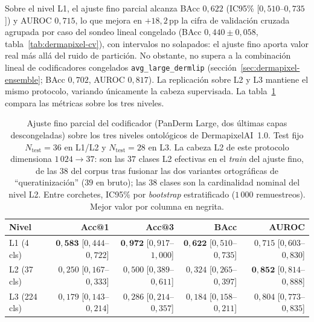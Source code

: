 Sobre el nivel L1, el ajuste fino parcial alcanza BAcc $0{,}622$
(IC95\% [$0{,}510$--$0{,}735$]) y AUROC $0{,}715$, lo que mejora en
$+18{,}2$\,pp la cifra de validación cruzada agrupada por caso del
sondeo lineal congelado (BAcc $0{,}440 \pm 0{,}058$,
tabla~\ref{tab:dermapixel-cv}), con intervalos no solapados: el
ajuste fino aporta valor real más allá del ruido de partición. No
obstante, no supera a la combinación lineal de codificadores
congelados \texttt{avg\_large\_dermlip}
(sección~\ref{sec:dermapixel-ensemble}; BAcc $0{,}702$, AUROC
$0{,}817$). La replicación sobre L2 y L3 mantiene el mismo
protocolo, variando únicamente la cabeza supervisada. La
tabla~\ref{tab:dermapixel-ft-multilevel} compara las métricas
sobre los tres niveles.

\begin{table}[H]
\centering
\footnotesize
\setlength{\tabcolsep}{4pt}
\renewcommand{\arraystretch}{0.95}
\caption{Ajuste fino parcial del codificador (PanDerm Large, dos
últimas capas descongeladas) sobre los tres niveles ontológicos de
DermapixelAI~1.0. Test fijo $N_{\mathrm{test}} = 36$ en L1/L2 y
$N_{\mathrm{test}} = 28$ en L3. La cabeza L2 de este protocolo
dimensiona $1\,024 \to 37$: son las $37$ clases L2 efectivas en el
\emph{train} del ajuste fino, de las $38$ del corpus tras fusionar
las dos variantes ortográficas de ``queratinización'' ($39$ en
bruto); las $38$ clases son la cardinalidad nominal del nivel L2.
Entre corchetes, IC95\% por \emph{bootstrap}
estratificado ($1\,000$ remuestreos). Mejor valor por columna en
negrita.}
\label{tab:dermapixel-ft-multilevel}
\begin{tabular}{lrrrr}
\hline
Nivel        & Acc@1                            & Acc@3                            & BAcc                             & AUROC \\
\hline
L1 (4 cls)   & $\mathbf{0{,}583}$ [$0{,}444$--$0{,}722$] & $\mathbf{0{,}972}$ [$0{,}917$--$1{,}000$] & $\mathbf{0{,}622}$ [$0{,}510$--$0{,}735$] & $0{,}715$ [$0{,}603$--$0{,}830$] \\
L2 (37 cls)  & $0{,}250$ [$0{,}167$--$0{,}333$] & $0{,}500$ [$0{,}389$--$0{,}611$] & $0{,}324$ [$0{,}265$--$0{,}397$] & $\mathbf{0{,}852}$ [$0{,}814$--$0{,}888$] \\
L3 (224 cls) & $0{,}179$ [$0{,}143$--$0{,}214$] & $0{,}286$ [$0{,}214$--$0{,}357$] & $0{,}184$ [$0{,}158$--$0{,}211$] & $0{,}804$ [$0{,}773$--$0{,}835$] \\
\hline
\end{tabular}
\end{table}

